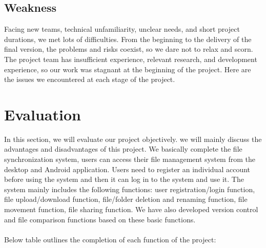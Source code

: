 \documentclass[12pt,a4]{article}
\begin{document}
\subsection{Weakness}\label{5.4}
Facing new teams, technical unfamiliarity, unclear needs, and short project durations, we met lots of difficulties. From the beginning to the delivery of the final version, the problems and risks coexist, so we dare not to relax and scorn. 
The project team has insufficient experience, relevant research, and development experience, so our work was stagnant at the beginning of the project. Here are the issues we encountered at each stage of the project.

\section{Evaluation}\label{6}
In this section, we will evaluate our project objectively. we will mainly discuss the advantages and disadvantages of this project.
We basically complete the file synchronization system, users can access their file management system from the desktop and Android application. Users need to register an individual account before using the system and then it can log in to the system and use it. The system mainly includes the following functions: user registration/login function, file upload/download function, file/folder deletion and renaming function, file movement function, file sharing function. We have also developed version control and file comparison functions based on these basic functions.
\\
\\
Below table outlines the completion of each function of the project:
\end{document}
